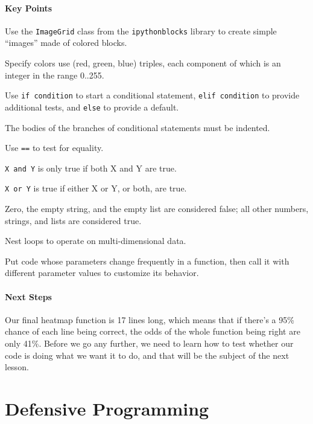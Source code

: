 \documentclass{book}
\begin{document}
\mbox{}\paragraph{Key Points}

\begin{swcitemize}
\item
  Use the \texttt{ImageGrid} class from the \texttt{ipythonblocks}
  library to create simple ``images'' made of colored blocks.
\item
  Specify colors use (red, green, blue) triples, each component of which
  is an integer in the range 0..255.
\item
  Use \texttt{if condition} to start a conditional statement,
  \texttt{elif condition} to provide additional tests, and \texttt{else}
  to provide a default.
\item
  The bodies of the branches of conditional statements must be indented.
\item
  Use \texttt{==} to test for equality.
\item
  \texttt{X and Y} is only true if both X and Y are true.
\item
  \texttt{X or Y} is true if either X or Y, or both, are true.
\item
  Zero, the empty string, and the empty list are considered false; all
  other numbers, strings, and lists are considered true.
\item
  Nest loops to operate on multi-dimensional data.
\item
  Put code whose parameters change frequently in a function, then call
  it with different parameter values to customize its behavior.
\end{swcitemize}

\mbox{}\paragraph{Next Steps}

Our final heatmap function is 17 lines long, which means that if there's
a 95\% chance of each line being correct, the odds of the whole function
being right are only 41\%. Before we go any further, we need to learn
how to test whether our code is doing what we want it to do, and that
will be the subject of the next lesson.

\section{Defensive Programming}
\end{document}
